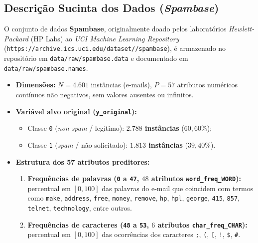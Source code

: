 \documentclass[a4paper,11pt]{article}
\begin{document}
\subsection{\texorpdfstring{Descrição Sucinta dos Dados (\textit{Spambase})}{Descrição Sucinta dos Dados (Spambase)}}\label{sec:1-2-descricao-sucinta-dos-dados-spambase}


O conjunto de dados \textbf{Spambase}, originalmente doado pelos laboratórios \textit{Hewlett-Packard} (HP Labs) ao \textit{UCI Machine Learning Repository} (\texttt{https:/\allowbreak /\allowbreak archive.ics.uci.edu/\allowbreak dataset//\allowbreak spambase}), é armazenado no repositório em \texttt{data/\allowbreak raw/\allowbreak spambase.data} e documentado em \texttt{data/\allowbreak raw/\allowbreak spambase.names}.

\begin{itemize}[leftmargin=1.5em, itemsep=0.25em, topsep=0.25em]
  \item \textbf{Dimensões:} $N = 4.601$ instâncias (e-mails), $P = 57$ atributos numéricos contínuos não negativos, sem valores ausentes ou infinitos.
  \item \textbf{Variável alvo original (\texttt{y\_\allowbreak original}):}
\begin{itemize}[leftmargin=1.5em, itemsep=0.25em, topsep=0.25em]
  \item Classe \texttt{0} (\textit{non-spam} / legítimo): \textbf{$2.788$ instâncias} ($60,60\%$);
  \item Classe \texttt{1} (\textit{spam} / não solicitado): \textbf{$1.813$ instâncias} ($39,40\%$).
\end{itemize}
  \item \textbf{Estrutura dos 57 atributos preditores:}
\begin{enumerate}[leftmargin=1.5em, itemsep=0.25em, topsep=0.25em]
  \item \textbf{Frequências de palavras (\texttt{0} a \texttt{47}, $48$ atributos \texttt{word\_\allowbreak freq\_\allowbreak WORD}):} percentual em $[0, 100]$ das palavras do e-mail que coincidem com termos como \texttt{make}, \texttt{address}, \texttt{free}, \texttt{money}, \texttt{remove}, \texttt{hp}, \texttt{hpl}, \texttt{george}, \texttt{415}, \texttt{857}, \texttt{telnet}, \texttt{technology}, entre outros.
  \item \textbf{Frequências de caracteres (\texttt{48} a \texttt{53}, $6$ atributos \texttt{char\_\allowbreak freq\_\allowbreak CHAR}):} percentual em $[0, 100]$ das ocorrências dos caracteres \texttt{;}, \texttt{(\allowbreak }, \texttt{[}, \texttt{!}, \texttt{\$}, \texttt{\#}.

\end{enumerate}
\end{itemize}
\end{document}
